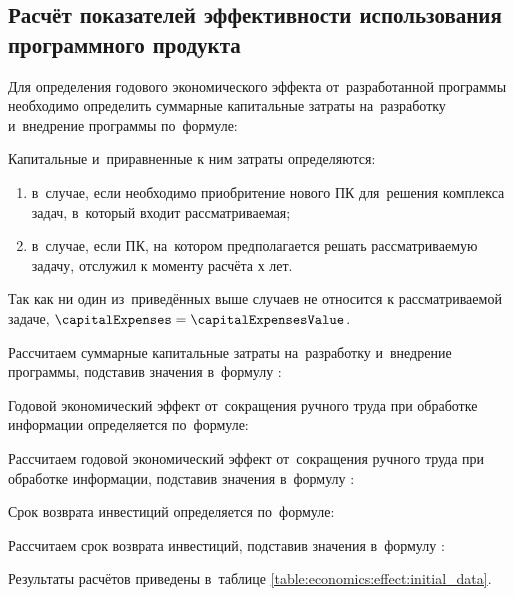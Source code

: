 \subsection{Расчёт показателей эффективности использования программного продукта}
\label{sec:economics:efficiency}

Для определения годового экономического эффекта от~разработанной программы необходимо определить суммарные капитальные затраты на~разработку и~внедрение программы по~формуле:
\totalCapitalExpensesEquation

Капитальные и~приравненные к ним затраты определяются:
\begin{enumerate}
	\item в~случае, если необходимо приобритение нового ПК для~решения комплекса задач, в~который входит рассматриваемая;
	\item в~случае, если ПК, на~котором предполагается решать рассматриваемую задачу, отслужил к моменту расчёта х лет.
\end{enumerate}

Так как ни один из~приведённых выше случаев не относится к рассматриваемой задаче, \(\capitalExpenses = \capitalExpensesValue\).

Рассчитаем суммарные капитальные затраты на~разработку и~внедрение программы, подставив значения в~формулу :
\totalCapitalExpensesFormulaApplied

Годовой экономический эффект от~сокращения ручного труда при обработке информации определяется по~формуле:
\annualEconomicEffectEquation

Рассчитаем годовой экономический эффект от~сокращения ручного труда при обработке информации, подставив значения в~формулу :
\annualEconomicEffectFormulaApplied

Срок возврата инвестиций определяется по~формуле:
\investmentMoneyReturnTimeEquation

Рассчитаем срок возврата инвестиций, подставив значения в~формулу :
\investmentMoneyReturnTimeFormulaApplied

Результаты расчётов приведены в~таблице \ref{table:economics:effect:initial_data}.

